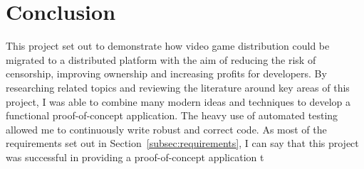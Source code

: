 \section*{Conclusion}

This project set out to demonstrate how video game distribution could be migrated to a distributed platform with the aim of reducing the risk of censorship, improving ownership and increasing profits for developers.
\x
By researching related topics and reviewing the literature around key areas of this project, I was able to combine many modern ideas and techniques to develop a functional proof-of-concept application. The heavy use of automated testing allowed me to continuously write robust and correct code.
\x
As most of the requirements set out in Section~\ref{subsec:requirements}, I can say that this project was successful in providing a proof-of-concept application t